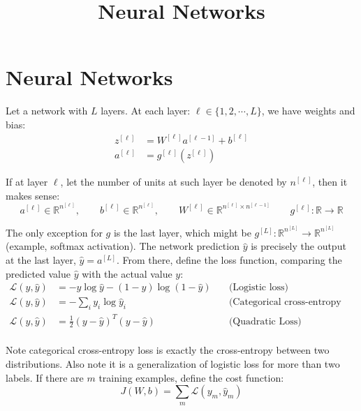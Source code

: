\documentclass[a4paper, 12pt]{report}
\begin{document}
\title{Neural Networks}
\maketitle

\section{Neural Networks}
Let a network with $L$ layers. At each layer: $\ell\in\{1, 2, \cdots, L\}$, we have weights and bias:
\begin{equation}
\begin{array}{ll}
z^{[\ell]} &= W^{[\ell]} a^{[\ell-1]} + b^{[\ell]} \\
a^{[\ell]} &= g^{[\ell]}(z^{[\ell]})
\end{array}
\end{equation}

If at layer $\ell$, let the number of units at such layer be denoted by $n^{[\ell]}$, then it makes sense:
\begin{equation}
a^{[\ell]}\in\mathbb{R}^{n^{[\ell]}},\quad\quad
b^{[\ell]}\in\mathbb{R}^{n^{[\ell]}},\quad\quad
W^{[\ell]}\in\mathbb{R}^{n^{[\ell]}\times n^{[\ell-1]}}\quad\quad
g^{[\ell]}: \mathbb{R}\to\mathbb{R}
\end{equation}

The only exception for $g$ is the last layer, which might be $g^{[L]}: \mathbb{R}^{n^{[L]}}\to\mathbb{R}^{n^{[L]}}$ (example, softmax activation).
The network prediction $\hat y$ is precisely the output at the last layer, $\hat y = a^{[L]}$. From there, define the loss function, comparing the predicted value $\hat y$ with the actual value $y$:
\begin{equation}
\begin{array}{lll}
\mathcal L(y, \hat y) &= -y\log\hat y - (1-y)\log(1-\hat y)\quad&\text{(Logistic loss)} \\
\mathcal L(y, \hat y) &= -\sum_i y_i\log\hat y_i\quad&\text{(Categorical cross-entropy loss)} \\
\mathcal L(y, \hat y) &= \frac{1}{2}(y-\hat y)^T(y-\hat y)&\text{(Quadratic Loss)} \\
\end{array}
\end{equation}

Note categorical cross-entropy loss is exactly the cross-entropy between two distributions. Also note it is a generalization of logistic loss for more than two labels. If there are $m$ training examples, define the cost function:
\begin{equation}
J(W,b) = \sum_m\mathcal L(y_m, \hat y_m)
\end{equation}
\end{document}
